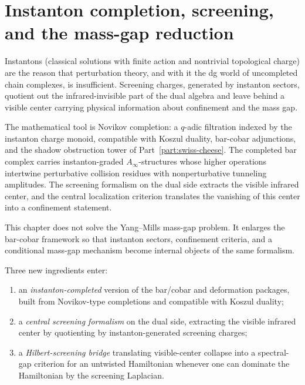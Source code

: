 \chapter{Instanton completion, screening, and the mass-gap reduction}
\label{ch:ym-instanton-screening}


Instantons (classical solutions with finite action and nontrivial
topological charge) are the reason that perturbation theory, and with
it the dg world of uncompleted chain complexes, is insufficient.
Screening charges, generated by instanton sectors, quotient out the
infrared-invisible part of the dual algebra and leave behind a visible
center carrying physical information about confinement and the mass gap.

The mathematical tool is Novikov completion: a $q$-adic filtration
indexed by the instanton charge monoid, compatible with Koszul duality,
bar-cobar adjunctions, and the shadow obstruction tower of Part~\ref{part:swiss-cheese}. The completed
bar complex carries instanton-graded $A_\infty$-structures whose higher
operations intertwine perturbative collision residues with
nonperturbative tunneling amplitudes. The screening formalism on the
dual side extracts the visible infrared center, and the central
localization criterion translates the vanishing of this center into a
confinement statement.

This chapter does not solve the Yang--Mills mass-gap problem. It
enlarges the bar-cobar framework so that instanton sectors, confinement
criteria, and a conditional mass-gap mechanism become internal objects
of the same formalism.

Three new ingredients enter:
\begin{enumerate}[label=(\roman*)]
\item an \emph{instanton-completed} version of the bar/cobar and
deformation packages, built from Novikov-type completions and
compatible with Koszul duality;
\item a \emph{central screening formalism} on the dual side,
extracting the visible infrared center by quotienting by
instanton-generated screening charges;
\item a \emph{Hilbert-screening bridge} translating visible-center
collapse into a spectral-gap criterion for an untwisted Hamiltonian
whenever one can dominate the Hamiltonian by the screening Laplacian.
\end{enumerate}


